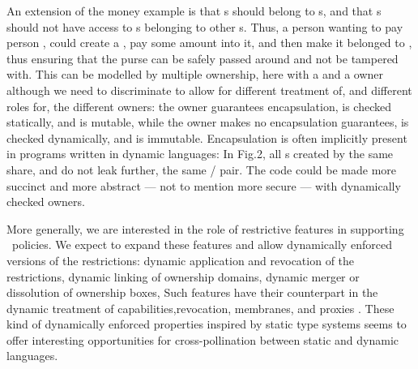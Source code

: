An  extension of the money example is that s should belong
to s, and that  s should not have access to   s belonging
to  other  s.
Thus, a person      wanting to pay person  ,  could create a , pay some amount into it,
and then make it belonged to , thus ensuring that the purse can be safely passed around and not be tampered with.
This can be modelled by  multiple ownership, here with a 
and a  owner \cite{multiple,rolesForOwners}
although we need to discriminate
to allow for different treatment of, and different roles for, the
different owners: the  owner guarantees encapsulation, is
checked statically, and is  mutable, while the   owner makes
no encapsulation guarantees, is checked dynamically, and is
immutable.
%
Encapsulation is often implicitly present in programs written in
dynamic languages: In Fig.2, all s created by the same  share, and do not leak further, the same / pair. The code could be made more succinct and more
abstract --- not to mention more secure --- with dynamically checked owners\cite{dynamicOwn}.



More generally, we are interested in the role of restrictive features in supporting \deny~policies. We expect to expand these features and allow  dynamically enforced versions of the restrictions: dynamic application and revocation of the restrictions,  dynamic  linking of ownership domains\cite{ODs},  dynamic merger or dissolution of ownership boxes, \etc Such features have their counterpart in the dynamic treatment of
 capabilities,\eg revocation, membranes, and proxies
 \cite{membranes,membranesJavascript,proxiesECOOP2013}.
These kind of  dynamically enforced  properties inspired by static type
systems seems to offer interesting opportunities for cross-pollination
between  static and dynamic  languages.




